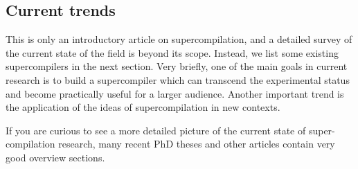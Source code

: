 \subsection{Current trends}

This is only an introductory article on supercompilation, and 
a detailed survey of the current state of the field is
beyond its scope.
Instead, we list some existing supercompilers in the next section.
Very briefly, one of the main goals in current research is to build a
supercompiler which can transcend the experimental status
and become practically useful for a larger audience.
Another important trend is the application of the ideas of supercompilation
in new contexts.

If you are curious to see a more detailed picture of the current
state of super-compilation research, many recent PhD theses and other articles
\cite{Sorensen1994TurchinSupercompiler,Secher1999Perfect,Secher2002DrivingBased,Mitchell2008taa,Nemytykh2008PhD,Jonsson2008Supercompilation,Klyuchnikov2010Phd,Jonsson2011Phd}
contain very good overview sections.
